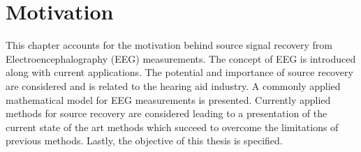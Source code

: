 \chapter{Motivation}\label{ch:motivation}
This chapter accounts for the motivation behind source signal recovery from Electroencephalography (EEG) measurements. The concept of EEG is introduced along with current applications. The potential and importance of source recovery are considered and is related to the hearing aid industry. A commonly applied mathematical model for EEG measurements is presented. Currently applied methods for source recovery are considered leading to a presentation of the current state of the art methods which succeed to overcome the limitations of previous methods. Lastly, the objective of this thesis is specified.          



